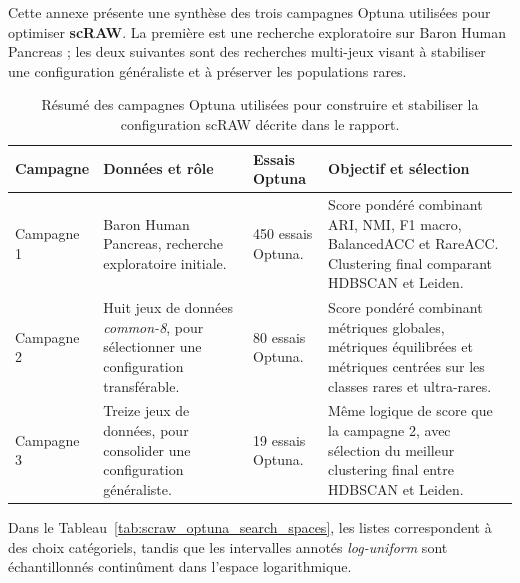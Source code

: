 Cette annexe présente une synthèse des trois campagnes Optuna utilisées pour optimiser \textbf{scRAW}. La première est une recherche exploratoire sur Baron Human Pancreas ; les deux suivantes sont des recherches multi-jeux visant à stabiliser une configuration généraliste et à préserver les populations rares.

\begin{table}[H]
\centering
\scriptsize
\setlength{\tabcolsep}{3pt}
\renewcommand{\arraystretch}{1.15}
\begin{tabularx}{\textwidth}{p{}p{}p{}X}
\toprule
\textbf{Campagne} & \textbf{Données et rôle} & \textbf{Essais Optuna} & \textbf{Objectif et sélection} \\
\midrule
Campagne 1 & Baron Human Pancreas, recherche exploratoire initiale. & 450 essais Optuna. & Score pondéré combinant ARI, NMI, F1 macro, BalancedACC et RareACC. Clustering final comparant HDBSCAN et Leiden. \\
Campagne 2 & Huit jeux de données \textit{common-8}, pour sélectionner une configuration transférable. & 80 essais Optuna. & Score pondéré combinant métriques globales, métriques équilibrées et métriques centrées sur les classes rares et ultra-rares. \\
Campagne 3 & Treize jeux de données, pour consolider une configuration généraliste. & 19 essais Optuna. & Même logique de score que la campagne 2, avec sélection du meilleur clustering final entre HDBSCAN et Leiden. \\
\bottomrule
\end{tabularx}
\caption{Résumé des campagnes Optuna utilisées pour construire et stabiliser la configuration scRAW décrite dans le rapport.}
\label{tab:scraw_optuna_runs_summary}
\end{table}

Dans le Tableau~\ref{tab:scraw_optuna_search_spaces}, les listes correspondent à des choix catégoriels, tandis que les intervalles annotés \textit{log-uniform} sont échantillonnés continûment dans l'espace logarithmique.

